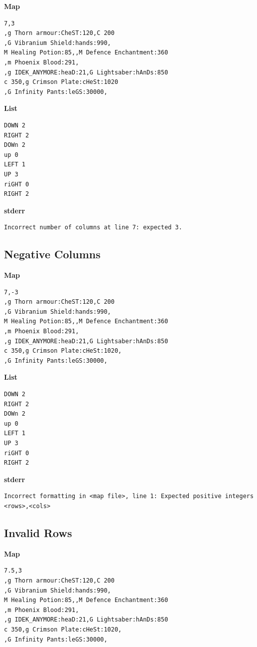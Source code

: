 \documentclass{article}
\begin{document}
\quad \textbf{Map}
\begin{lstlisting}
7,3
,g Thorn armour:CheST:120,C 200
,G Vibranium Shield:hands:990,
M Healing Potion:85,,M Defence Enchantment:360
,m Phoenix Blood:291,
,g IDEK_ANYMORE:heaD:21,G Lightsaber:hAnDs:850
c 350,g Crimson Plate:cHeSt:1020
,G Infinity Pants:leGS:30000,
\end{lstlisting}

\textbf{List}
\begin{lstlisting}
DOWN 2
RIGHT 2
DOWn 2
up 0
LEFT 1
UP 3
riGHT 0
RIGHT 2
\end{lstlisting}
\pagebreak

\textbf{stderr}
\begin{lstlisting}
Incorrect number of columns at line 7: expected 3.
\end{lstlisting}

\subsection{Negative Columns}

\quad \textbf{Map}
\begin{lstlisting}
7,-3
,g Thorn armour:CheST:120,C 200
,G Vibranium Shield:hands:990,
M Healing Potion:85,,M Defence Enchantment:360
,m Phoenix Blood:291,
,g IDEK_ANYMORE:heaD:21,G Lightsaber:hAnDs:850
c 350,g Crimson Plate:cHeSt:1020,
,G Infinity Pants:leGS:30000,
\end{lstlisting}

\textbf{List}
\begin{lstlisting}
DOWN 2
RIGHT 2
DOWn 2
up 0
LEFT 1
UP 3
riGHT 0
RIGHT 2
\end{lstlisting}
\pagebreak

\textbf{stderr}
\begin{lstlisting}
Incorrect formatting in <map file>, line 1: Expected positive integers <rows>,<cols>
\end{lstlisting}

\subsection{Invalid Rows}

\quad \textbf{Map}
\begin{lstlisting}
7.5,3
,g Thorn armour:CheST:120,C 200
,G Vibranium Shield:hands:990,
M Healing Potion:85,,M Defence Enchantment:360
,m Phoenix Blood:291,
,g IDEK_ANYMORE:heaD:21,G Lightsaber:hAnDs:850
c 350,g Crimson Plate:cHeSt:1020,
,G Infinity Pants:leGS:30000,
\end{lstlisting}
\end{document}
